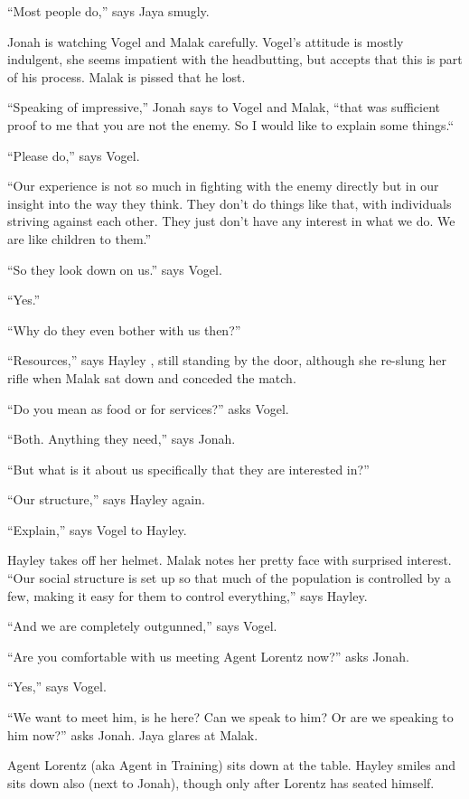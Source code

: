 ``Most people do,'' says Jaya smugly.

Jonah is watching Vogel and Malak carefully.  Vogel's attitude is mostly indulgent, she seems impatient with the headbutting, but accepts that this is part of his process.  Malak is pissed that he lost.



``Speaking of impressive,'' Jonah says to Vogel and Malak, ``that was sufficient proof to me that you are not the enemy.  So I would like to explain some things.``

``Please do,'' says Vogel.

``Our experience is not so much in fighting with the enemy directly but in our insight into the way they think.  They don't do things like that, with individuals striving against each other.  They just don't have any interest in what we do.  We are like children to them.''

``So they look down on us.'' says Vogel.

``Yes.''

``Why do they even bother with us then?''

``Resources,'' says Hayley , still standing by the door, although she re-slung her rifle when Malak sat down and conceded the match.

``Do you mean as food or for services?'' asks Vogel.

``Both.  Anything they need,'' says Jonah.

``But what is it about us specifically that they are interested in?''

``Our structure,'' says Hayley again.

``Explain,'' says Vogel to Hayley.

Hayley takes off her helmet.  Malak notes her pretty face with surprised interest.  ``Our social structure is set up so that much of the population is controlled by a few, making it easy for them to control everything,'' says Hayley.

``And we are completely outgunned,'' says Vogel.



``Are you comfortable with us meeting Agent Lorentz now?'' asks Jonah.

``Yes,'' says Vogel.

``We want to meet him, is he here?  Can we speak to him? Or are we speaking to him now?'' asks Jonah.  Jaya glares at Malak.

Agent Lorentz (aka Agent in Training) sits down at the table.  Hayley smiles and sits down also (next to Jonah), though only after Lorentz has seated himself.

